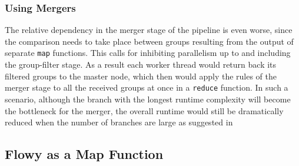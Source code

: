 \subsubsection{Using Mergers}\label{subsec:using-mergers}
The relative dependency in the merger stage of the pipeline is even worse, since the comparison needs to take place between groups resulting from the output of separate \texttt{map} functions. This calls for inhibiting parallelism up to and including the group-filter stage. As a result each worker thread would return back its filtered groups to the master node, which then would apply the rules of the merger stage to all the received groups at once in a \texttt{reduce} function. In such a scenario, although the branch with the longest runtime complexity will become the bottleneck for the merger, the overall runtime would still be dramatically reduced when the number of branches are large as suggested in \cite{jschauer:2012}

\subsection{Flowy as a Map Function}\label{subsec:flowy-map}
